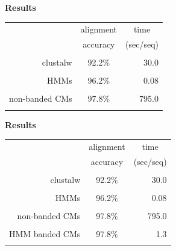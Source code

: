 \documentclass[landscape]{slides}
\begin{document}
\begin{slide}
\begin{center}
\large
\textbf{Results}
\end{center}
\medskip
\medskip
\begin{center}

\begin{tabular}{rcr} 
& \multicolumn{1}{c}{alignment} & \multicolumn{1}{c}{time} \\
& \multicolumn{1}{c}{accuracy} & \multicolumn{1}{c}{(sec/seq)} \\ \hline
& \multicolumn{1}{c}{} & \multicolumn{1}{c}{} \\
clustalw & 92.2\% & 30.0 \\ 
& \multicolumn{1}{c}{} & \multicolumn{1}{c}{} \\
HMMs & 96.2\% & 0.08 \\ 
& \multicolumn{1}{c}{} & \multicolumn{1}{c}{} \\
non-banded CMs & 97.8\% & 795.0 \\ 
& \multicolumn{1}{c}{} & \multicolumn{1}{c}{} \\
\end{tabular}
\end{center}

\vfill
\end{slide}
\begin{slide}
\begin{center}
\large
\textbf{Results}
\end{center}
\medskip
\medskip
\begin{center}

\begin{tabular}{rcr} 
& \multicolumn{1}{c}{alignment} & \multicolumn{1}{c}{time} \\
& \multicolumn{1}{c}{accuracy} & \multicolumn{1}{c}{(sec/seq)} \\ \hline
& \multicolumn{1}{c}{} & \multicolumn{1}{c}{} \\
clustalw & 92.2\% & 30.0 \\ 
& \multicolumn{1}{c}{} & \multicolumn{1}{c}{} \\
HMMs & 96.2\% & 0.08 \\ 
& \multicolumn{1}{c}{} & \multicolumn{1}{c}{} \\
non-banded CMs & 97.8\% & 795.0 \\ 
& \multicolumn{1}{c}{} & \multicolumn{1}{c}{} \\
HMM banded CMs & 97.8\% & 1.3 \\ %
& \multicolumn{1}{c}{} & \multicolumn{1}{c}{} \\
\end{tabular}
\end{center}

\vfill
\end{slide}
\end{document}
